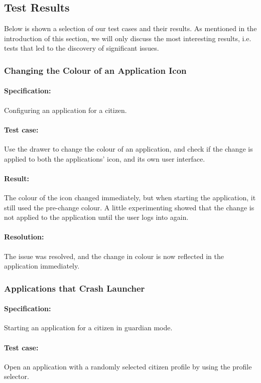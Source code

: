 \subsection{Test Results}\label{sec:sprint1:testing_results}
Below is shown a selection of our test cases and their results.
As mentioned in the introduction of this section, we will only discuss the most interesting results, i.e. tests that led to the discovery of significant issues.


\subsubsection{Changing the Colour of an Application Icon}

\paragraph{Specification:} Configuring an application for a citizen.
\paragraph{Test case:} Use the drawer to change the colour of an application, and check if the change is applied to both the applications' icon, and its own user interface.
\paragraph{Result:} The colour of the icon changed immediately, but when starting the application, it still used the pre-change colour. 
A little experimenting showed that the change is not applied to the application until the user logs into \launcher again.
\paragraph{Resolution:} The issue was resolved, and the change in colour is now reflected in the application immediately.

\subsubsection{Applications that Crash Launcher}

\paragraph{Specification:} Starting an application for a citizen in guardian mode.
\paragraph{Test case:} Open an application with a randomly selected citizen profile by using the profile selector.
